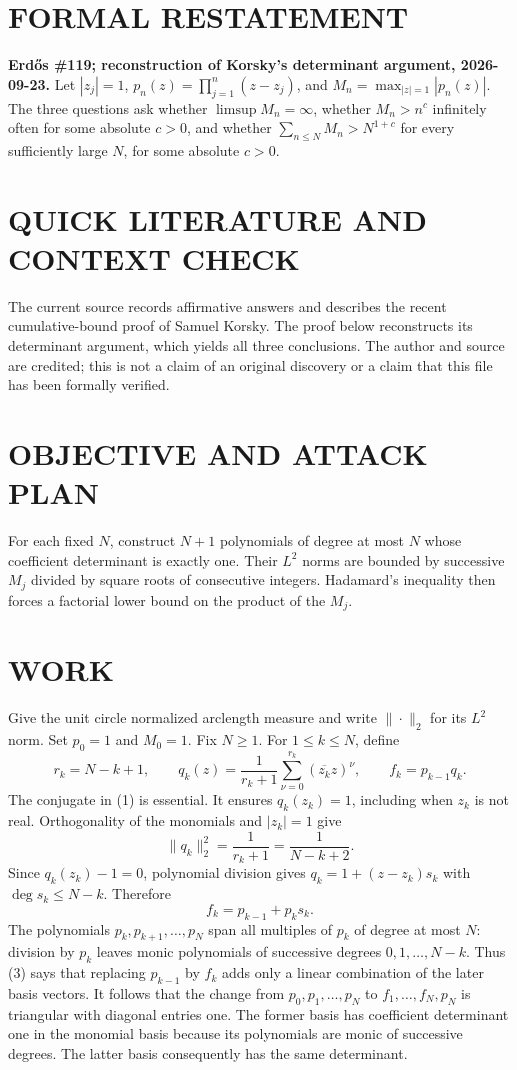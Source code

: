 \section{FORMAL RESTATEMENT}
\textbf{Erd\H{o}s \#119; reconstruction of Korsky's determinant argument, 2026-09-23.}
Let $|z_j|=1$, $p_n(z)=\prod_{j=1}^n(z-z_j)$, and $M_n=\max_{|z|=1}|p_n(z)|$. The three questions ask whether $\limsup M_n=\infty$, whether $M_n>n^c$ infinitely often for some absolute $c>0$, and whether $\sum_{n\leq N}M_n>N^{1+c}$ for every sufficiently large $N$, for some absolute $c>0$.

\section{QUICK LITERATURE AND CONTEXT CHECK}
The current source records affirmative answers and describes the recent cumulative-bound proof of Samuel Korsky. The proof below reconstructs its determinant argument, which yields all three conclusions. The author and source are credited; this is not a claim of an original discovery or a claim that this file has been formally verified.

\section{OBJECTIVE AND ATTACK PLAN}
For each fixed $N$, construct $N+1$ polynomials of degree at most $N$ whose coefficient determinant is exactly one. Their $L^2$ norms are bounded by successive $M_j$ divided by square roots of consecutive integers. Hadamard's inequality then forces a factorial lower bound on the product of the $M_j$.

\section{WORK}
Give the unit circle normalized arclength measure and write $\|\cdot\|_2$ for its $L^2$ norm. Set $p_0=1$ and $M_0=1$. Fix $N\geq1$. For $1\leq k\leq N$, define
\[
r_k=N-k+1,\qquad q_k(z)=\frac1{r_k+1}\sum_{\nu=0}^{r_k}(\overline{z_k}z)^\nu,
\qquad f_k=p_{k-1}q_k.
\tag{1}
\]
The conjugate in (1) is essential. It ensures $q_k(z_k)=1$, including when $z_k$ is not real. Orthogonality of the monomials and $|z_k|=1$ give
\[
\|q_k\|_2^2=\frac1{r_k+1}=\frac1{N-k+2}.
\tag{2}
\]
Since $q_k(z_k)-1=0$, polynomial division gives $q_k=1+(z-z_k)s_k$ with $\deg s_k\leq N-k$. Therefore
\[
f_k=p_{k-1}+p_ks_k.
\tag{3}
\]
The polynomials $p_k,p_{k+1},\ldots,p_N$ span all multiples of $p_k$ of degree at most $N$: division by $p_k$ leaves monic polynomials of successive degrees $0,1,\ldots,N-k$. Thus (3) says that replacing $p_{k-1}$ by $f_k$ adds only a linear combination of the later basis vectors. It follows that the change from $p_0,p_1,\ldots,p_N$ to $f_1,\ldots,f_N,p_N$ is triangular with diagonal entries one. The former basis has coefficient determinant one in the monomial basis because its polynomials are monic of successive degrees. The latter basis consequently has the same determinant.


